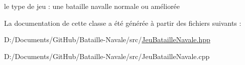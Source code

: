 le type de jeu \+: une bataille navalle normale ou améliorée 

La documentation de cette classe a été générée à partir des fichiers suivants \+:\begin{DoxyCompactItemize}
\item 
D\+:/\+Documents/\+Git\+Hub/\+Bataille-\/\+Navale/src/\mbox{\hyperlink{_jeu_bataille_navale_8hpp}{Jeu\+Bataille\+Navale.\+hpp}}\item 
D\+:/\+Documents/\+Git\+Hub/\+Bataille-\/\+Navale/src/Jeu\+Bataille\+Navale.\+cpp\end{DoxyCompactItemize}
